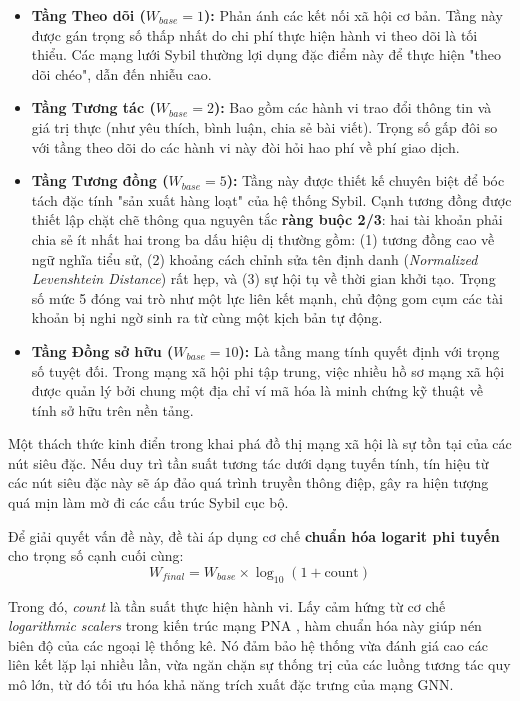 \begin{itemize}[label={--}, itemsep=3pt]
    \item \textbf{Tầng Theo dõi ($W_{base} = 1$):} Phản ánh các kết nối xã hội cơ bản. Tầng này được gán trọng số thấp nhất do chi phí thực hiện hành vi theo dõi là tối thiểu. Các mạng lưới Sybil thường lợi dụng đặc điểm này để thực hiện "theo dõi chéo", dẫn đến nhiễu cao.
    
    \item \textbf{Tầng Tương tác ($W_{base} = 2$):} Bao gồm các hành vi trao đổi thông tin và giá trị thực (như yêu thích, bình luận, chia sẻ bài viết). Trọng số gấp đôi so với tầng theo dõi do các hành vi này đòi hỏi hao phí về phí giao dịch.

    \item \textbf{Tầng Tương đồng ($W_{base} = 5$):} Tầng này được thiết kế chuyên biệt để bóc tách đặc tính "sản xuất hàng loạt" của hệ thống Sybil. Cạnh tương đồng được thiết lập chặt chẽ thông qua nguyên tắc \textbf{ràng buộc 2/3}: hai tài khoản phải chia sẻ ít nhất hai trong ba dấu hiệu dị thường gồm: (1) tương đồng cao về ngữ nghĩa tiểu sử, (2) khoảng cách chỉnh sửa tên định danh (\textit{Normalized Levenshtein Distance}) \cite{yujian2007normalized} rất hẹp, và (3) sự hội tụ về thời gian khởi tạo. Trọng số mức 5 đóng vai trò như một lực liên kết mạnh, chủ động gom cụm các tài khoản bị nghi ngờ sinh ra từ cùng một kịch bản tự động.
    
    \item \textbf{Tầng Đồng sở hữu ($W_{base} = 10$):} Là tầng mang tính quyết định với trọng số tuyệt đối. Trong mạng xã hội phi tập trung, việc nhiều hồ sơ mạng xã hội được quản lý bởi chung một địa chỉ ví mã hóa là minh chứng kỹ thuật về tính sở hữu trên nền tảng.
\end{itemize}

Một thách thức kinh điển trong khai phá đồ thị mạng xã hội là sự tồn tại của các nút siêu đặc. Nếu duy trì tần suất tương tác dưới dạng tuyến tính, tín hiệu từ các nút siêu đặc này sẽ áp đảo quá trình truyền thông điệp, gây ra hiện tượng quá mịn làm mờ đi các cấu trúc Sybil cục bộ.\vspace{0.3cm}

Để giải quyết vấn đề này, đề tài áp dụng cơ chế \textbf{chuẩn hóa logarit phi tuyến} cho trọng số cạnh cuối cùng:
\[
    W_{final} = W_{base} \times \log_{10}(1 + \text{count})
\]

Trong đó, \textit{count} là tần suất thực hiện hành vi. Lấy cảm hứng từ cơ chế \textit{logarithmic scalers} trong kiến trúc mạng PNA \cite{corso2020principal}, hàm chuẩn hóa này giúp nén biên độ của các ngoại lệ thống kê. Nó đảm bảo hệ thống vừa đánh giá cao các liên kết lặp lại nhiều lần, vừa ngăn chặn sự thống trị của các luồng tương tác quy mô lớn, từ đó tối ưu hóa khả năng trích xuất đặc trưng của mạng GNN.